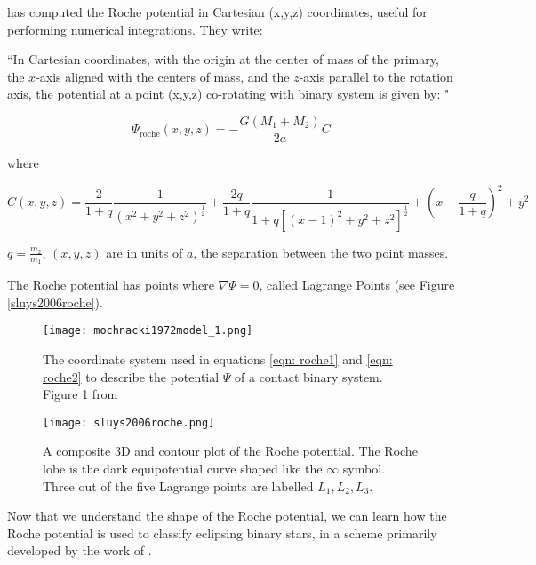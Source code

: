 \documentclass[12pt]{article} %
\numberwithin{equation}{section} %
\begin{document}
\citet{mochnacki1984accurate} has computed the Roche potential in Cartesian (x,y,z) coordinates, useful for performing numerical integrations. They write:

``In Cartesian coordinates, with the origin at the center of mass of the primary, the $x$-axis aligned with the centers of mass, and the $z$-axis parallel to the rotation axis, the potential at a point (x,y,z) co-rotating with binary system is given by: "

\begin{equation} \label{eqn: roche1}
\Psi_{\text{roche}}(x,y,z)= -\frac{G(M_{1} + M_{2})}{2a} C
\end{equation}

where 

\begin{equation} \label{eqn: roche2}
C(x,y,z) = \frac{2}{1+q} \frac{1}{(x^{2} + y^{2} + z^{2})^{\frac{1}{2}}} + \frac{2q}{1 + q} \frac{1}{1 + q[(x -1)^{2} + y^{2} + z^{2}]^{\frac{1}{2}}} + (x - \frac{q}{1 + q})^{2} + y^{2}
\end{equation}

$q = \frac{m_{2}}{m_{1}}$, $(x,y,z)$ are in units of $a$, the separation between the two point masses.

The Roche potential has points where $\nabla \Psi = 0$, called Lagrange Points (see Figure \ref{sluys2006roche}). 

\begin{figure}[H]
\centering
\texttt{[image: mochnacki1972model\_1.png]}
\caption{The coordinate system used in equations \ref{eqn: roche1} and \ref{eqn: roche2} to describe the potential $\Psi$ of a contact binary system. Figure 1 from \citet{mochnacki1972model}}
\label{fig: mochnacki1972model_1}
\end{figure}

\begin{figure}[H]
\centering
\texttt{[image: sluys2006roche.png]}
\caption{A composite 3D and contour plot of the Roche potential. The Roche lobe is the dark equipotential curve shaped like the $\infty$ symbol. Three out of the five Lagrange points are labelled $L_{1}, L_{2}, L_{3}$.  \citep{sluys2006roche}}
\label{fig: sluys2006roche}
\end{figure}

Now that we understand the shape of the Roche potential, we can learn how the Roche potential is used to classify eclipsing binary stars, in a scheme primarily developed by the work of \citet{kopal1959close}.
\end{document}
